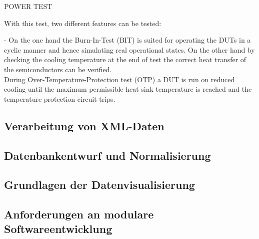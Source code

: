 POWER TEST

With this test, two different features can be tested:

- On the one hand the Burn-In-Test (BIT) is suited for operating the DUTs in a cyclic manner and hence simulating real operational states.
On the other hand by checking the cooling temperature at the end of test the correct heat transfer of the semiconductors can be verified.\\
During Over-Temperature-Protection test (OTP) a DUT is run on reduced cooling until the maximum permissible heat sink temperature is reached and the temperature protection circuit trips.


\subsection{Verarbeitung von XML-Daten}

\subsection{Datenbankentwurf und Normalisierung}

\subsection{Grundlagen der Datenvisualisierung}

\subsection{Anforderungen an modulare Softwareentwicklung}